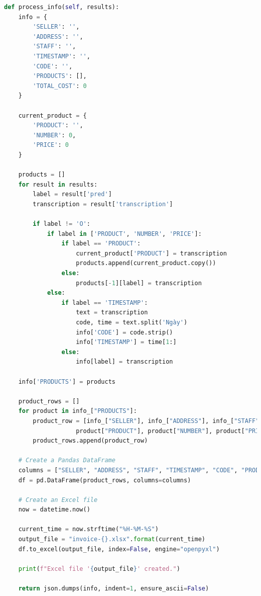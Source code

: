 \begin{lstlisting}[language=Python]
def process_info(self, results):
    info = {
        'SELLER': '',
        'ADDRESS': '',
        'STAFF': '',
        'TIMESTAMP': '',
        'CODE': '',
        'PRODUCTS': [],
        'TOTAL_COST': 0
    }
    
    current_product = {
        'PRODUCT': '',
        'NUMBER': 0,
        'PRICE': 0
    }
    
    products = []
    for result in results:
        label = result['pred']
        transcription = result['transcription']
        
        if label != 'O':
            if label in ['PRODUCT', 'NUMBER', 'PRICE']:
                if label == 'PRODUCT':
                    current_product['PRODUCT'] = transcription
                    products.append(current_product.copy())
                else:
                    products[-1][label] = transcription
            else: 
                if label == 'TIMESTAMP':
                    text = transcription
                    code, time = text.split('Ngày')
                    info['CODE'] = code.strip()
                    info['TIMESTAMP'] = time[1:]
                else:
                    info[label] = transcription
                    
    info['PRODUCTS'] = products 

    product_rows = []
    for product in info_["PRODUCTS"]:
        product_row = [info_["SELLER"], info_["ADDRESS"], info_["STAFF"], info_["TIMESTAMP"], info_["CODE"],
                    product["PRODUCT"], product["NUMBER"], product["PRICE"], info_["TOTAL_COST"]]
        product_rows.append(product_row)

    # Create a Pandas DataFrame
    columns = ["SELLER", "ADDRESS", "STAFF", "TIMESTAMP", "CODE", "PRODUCT", "NUMBER", "PRICE", "TOTAL_COST"]
    df = pd.DataFrame(product_rows, columns=columns)

    # Create an Excel file
    now = datetime.now()

    current_time = now.strftime("%H-%M-%S")
    output_file = "invoice-{}.xlsx".format(current_time)
    df.to_excel(output_file, index=False, engine="openpyxl")

    print(f"Excel file '{output_file}' created.")

    return json.dumps(info, indent=1, ensure_ascii=False)
\end{lstlisting}

